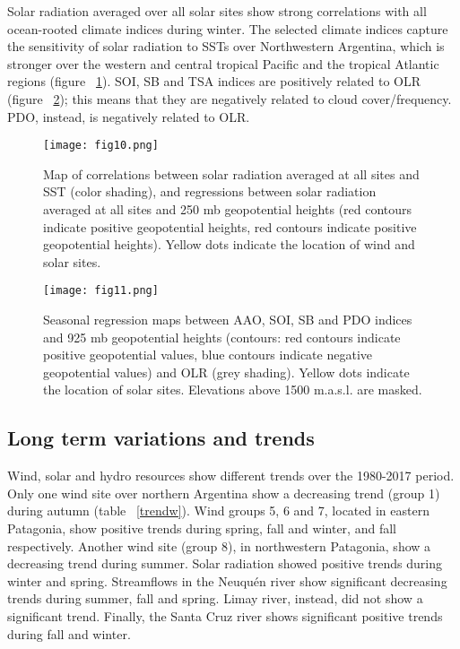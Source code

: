\documentclass[AMA,Times1COL]{WileyNJDv5} %
\begin{document}
\begin{linenumbers}
Solar radiation averaged over all solar sites show strong correlations with all ocean-rooted climate indices during winter. The selected climate indices capture the sensitivity of solar radiation to SSTs over Northwestern Argentina, which is stronger over the western and central tropical Pacific and the tropical Atlantic regions (figure ~\ref{sst}). SOI, SB and TSA indices are positively related to OLR (figure ~\ref{reg3}); this means that they are negatively related to cloud cover/frequency. PDO, instead, is negatively related to OLR. 

\begin{figure}[hbpt]
	\centering
	\hspace*{0cm}   
	\texttt{[image: fig10.png]}
	\caption{\label{sst} Map of correlations between solar radiation averaged at all sites and SST (color shading), and regressions between solar radiation averaged at all sites and 250 mb geopotential heights (red contours indicate positive geopotential heights, red contours indicate positive geopotential heights). Yellow dots indicate the location of wind and solar sites.}
\end{figure}

\begin{figure}[hbpt]
	\centering
	\hspace*{-1cm}   
	\texttt{[image: fig11.png]}
	\caption{\label{reg3} Seasonal regression maps between AAO, SOI, SB and PDO indices and 925 mb geopotential heights (contours: red contours indicate positive geopotential values, blue contours indicate negative geopotential values) and OLR  (grey shading). Yellow dots indicate the location of solar sites. Elevations above 1500 m.a.s.l. are masked.}
\end{figure}

\subsection{Long term variations and trends}

Wind, solar and hydro resources show different trends over the 1980-2017 period. Only one wind site over northern Argentina show a decreasing trend (group 1) during autumn (table ~\ref{trendw}). Wind groups 5, 6 and 7, located in eastern Patagonia, show positive trends during spring, fall and winter, and fall respectively. Another wind site (group 8), in northwestern Patagonia, show a decreasing trend during summer. Solar radiation showed positive trends during winter and spring. Streamflows in the Neuquén river show significant decreasing trends during summer, fall and spring. Limay river, instead, did not show a significant trend. Finally, the Santa Cruz river shows significant positive trends during fall and winter. 


\end{linenumbers}
\end{document}
